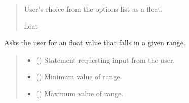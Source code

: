 \documentclass[letterpaper,10pt,english]{sphinxmanual}
\begin{document}
\begin{fulllineitems}
\begin{fulllineitems}
\begin{quote}
\begin{description}
\begin{itemize}
\end{itemize}

\sphinxAtStartPar
User’s choice from the options list as a float.

\sphinxAtStartPar
float

\end{description}\end{quote}

\end{fulllineitems}


\begin{fulllineitems}
\label{\detokenize{GetUserInput:GetUserInput.UserInput.AskForFloatInRange}}
\pysigstartsignatures
{}
\pysigstopsignatures
\sphinxAtStartPar
Asks the user for an float value that falls in a given range.
\begin{quote}\begin{description}
\begin{itemize}
\item {} 
\sphinxAtStartPar
{} () \textendash{} Statement requesting input from the user.

\item {} 
\sphinxAtStartPar
{} () \textendash{} Minimum value of range.

\item {} 
\sphinxAtStartPar
{} () \textendash{} Maximum value of range.


\end{itemize}
\end{description}
\end{quote}
\end{fulllineitems}
\end{fulllineitems}
\end{document}
